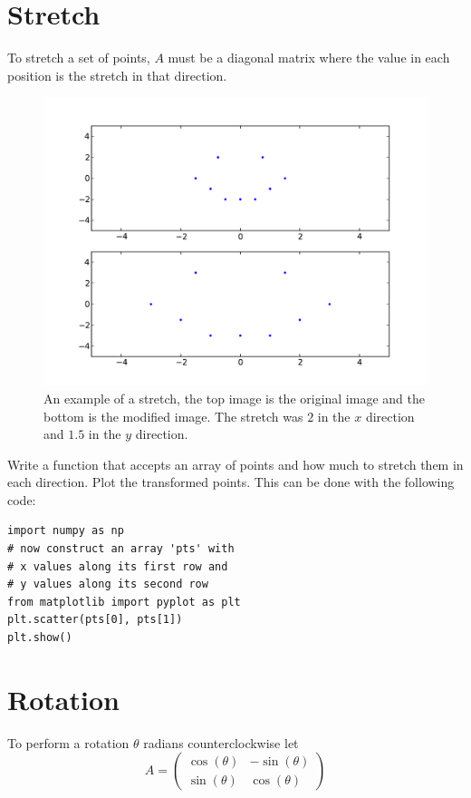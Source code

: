 \section*{Stretch}
To stretch a set of points, $A$ must be a diagonal matrix where the value in each position is the stretch in that direction.
\begin{figure}
\centering
\includegraphics[width=\textwidth]{stretch.pdf}
\caption{
An example of a stretch, the top image is the original image and the bottom is the modified image.
The stretch was $2$ in the $x$ direction and $1.5$ in the $y$ direction.}
\end{figure}

\begin{problem}
Write a function that accepts an array of points and how much to stretch them in each direction.
Plot the transformed points.
This can be done with the following code:
\begin{lstlisting}
import numpy as np
# now construct an array 'pts' with
# x values along its first row and
# y values along its second row
from matplotlib import pyplot as plt
plt.scatter(pts[0], pts[1])
plt.show()
\end{lstlisting}
\end{problem}

\section*{Rotation}

To perform a rotation $\theta$ radians counterclockwise let
\[
A = \begin{pmatrix}
\cos(\theta) & -\sin(\theta) \\
\sin(\theta) & \cos(\theta) 
\end{pmatrix}
\]

